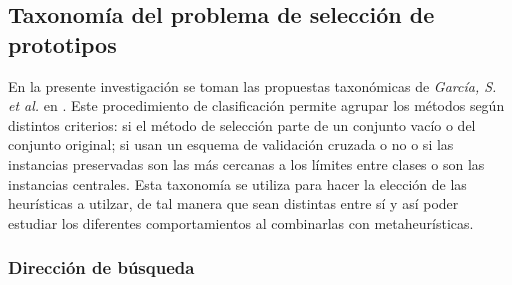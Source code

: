 
\subsection{Taxonomía del problema de selección de prototipos}

En la presente investigación se toman las propuestas taxonómicas de \emph{García, S. et al.} en \cite{garcia2012prototype}. Este procedimiento de clasificación permite agrupar los métodos según distintos criterios: si el método de selección parte de un conjunto vacío o del conjunto original; si usan un esquema de validación cruzada o no o si las instancias preservadas son las más cercanas a los límites entre clases o son las instancias centrales. Esta taxonomía se utiliza para hacer la elección de las heurísticas a utilzar, de tal manera que sean distintas entre sí y así poder estudiar los diferentes comportamientos al combinarlas con metaheurísticas.


\subsubsection{Dirección de búsqueda}

